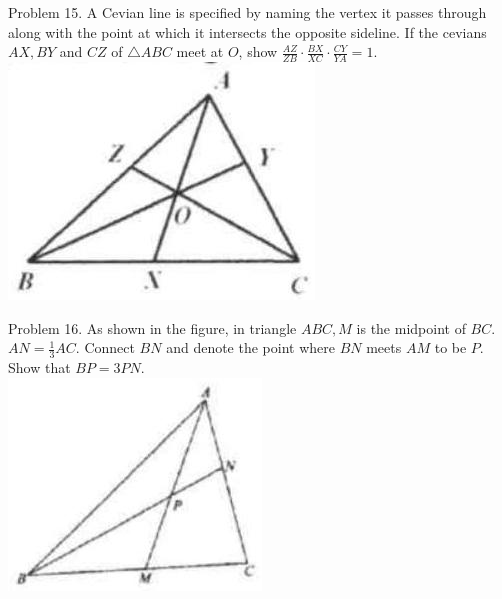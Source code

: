 \documentclass[10pt]{article}
\begin{document}
Problem 15. A Cevian line is specified by naming the vertex it passes through along with the point at which it intersects the opposite sideline. If the cevians \(A X, B Y\) and \(C Z\) of \(\triangle A B C\) meet at \(O\), show \(\frac{A Z}{Z B} \cdot \frac{B X}{X C} \cdot \frac{C Y}{Y A}=1\).\\
\includegraphics[max width=\textwidth, center]{2025_04_17_97bc1f7e44d93c271a88g-129}

Problem 16. As shown in the figure, in triangle \(A B C, M\) is the midpoint of \(B C\). \(A N=\frac{1}{3} A C\). Connect \(B N\) and denote the point where \(B N\) meets \(A M\) to be \(P\). Show that \(B P=3 P N\).\\
\includegraphics[max width=\textwidth, center]{2025_04_17_97bc1f7e44d93c271a88g-129(4)}
\end{document}
